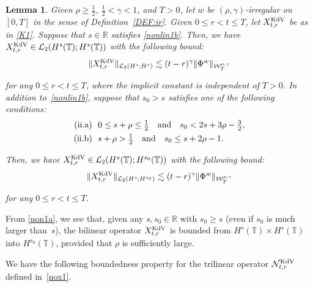 \documentclass[letterpaper, 11pt,  reqno]{amsart}
\newtheorem{lemma}[theorem]{Lemma}
\newcommand{\1}{\hspace{0.5mm}\text{I}\hspace{0.5mm}}
\newcommand{\noi}{\noindent}
\newcommand{\R}{\mathbb{R}}
\newcommand{\T}{\mathbb{T}}
\renewcommand{\L}{\mathcal{L}}
\newcommand{\g}{\gamma}
\newcommand{\les}{\lesssim}
\newcommand{\NN}{\mathcal{N}}
\newcommand{\W}{\mathcal{W}}
\newcommand{\KDV}{\text{\rm KdV} }
\numberwithin{equation}{section}
\numberwithin{theorem}{section}
\begin{document}
\begin{lemma}\label{LEM:nonlin1}
Given $\rho \ge\frac 12$,  $\frac12< \g < 1$, and $T> 0$, 
let  $w$ be $(\rho,\g)$-irregular on $[0, T]$ in the sense of Definition~\ref{DEF:ir}.
Given $0 \le r < t \le T$, let $X^\KDV_{t, r}$
be as in \eqref{K1}.
Suppose that $s \in \R$ satisfies \eqref{nonlin1b}.
Then, 
we have 
$X^\KDV_{t, r} \in \L_2(H^s(\T); H^{s}(\T))$
with the following bound\textup{:}
\begin{align}
 \|X^\KDV_{t, r}\|_{\L_2(H^s; H^{s})}
\les 
(t- r)^\g  \|\Phi^w\|_{  \W^{\rho,\g}_T} 
\label{non1c}
\end{align}

\noi
for any $0 \le r < t \le T$, 
where the implicit constant is independent of $T > 0$.
In addition to~\eqref{nonlin1b}, suppose that $s_0 > s$ satisfies
one of the following conditions\textup{:}
\begin{align}
\begin{split}
\textup{(ii.a)} &\ \  
0 \le s + \rho \le  \tfrac 12
 \quad \text{and} \quad 
s_0 < 2s +  3\rho - \tfrac 32, \\
\textup{(ii.b)} &\ \  
s + \rho >  \tfrac 12 
\quad  \text{and} \quad s_0 \le s + 2\rho - 1.
\end{split}
\label{non1a}
\end{align}




\noi
Then, 
we have 
$X^\KDV_{t, r} \in \L_2(H^s(\T); H^{s_0}(\T))$
with the following bound\textup{:}
\begin{align*}
 \|X^\KDV_{t, r}\|_{\L_2(H^s; H^{s_0})}
\les 
(t-r)^\g  \|\Phi^w\|_{  \W^{\rho,\g}_T}
\end{align*}

\noi
for any $0 \le r < t \le T$.



\end{lemma}

From \eqref{non1a}, we see that, 
given any $s, s_0 \in \R$ with $s_0 \ge s$
(even if $s_0$ is much larger than~$s$), 
the bilinear operator $X^\KDV_{t, r}$
is bounded 
 from $H^s(\T) \times H^s(\T)$ into $H^{s_0}(\T)$, 
 provided that $\rho$ is sufficiently large.











We have the following boundedness property for
the trilinear operator  $\NN^\KDV_{t, r}$
defined in~\eqref{nox1}.
\end{document}
